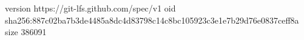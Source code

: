 version https://git-lfs.github.com/spec/v1
oid sha256:887c02ba7b3de4485a8dc4d83798c14c8bc105923c3e1e7b29d76e0837ceff8a
size 386091
